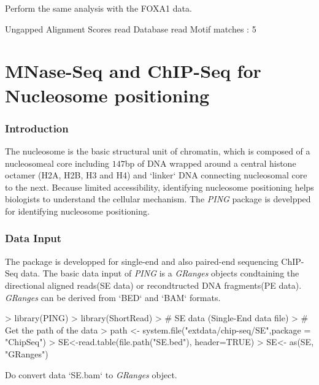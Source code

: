 \documentclass[12pt]{article}
\newcommand{\Rclass}[1]{{\textit{#1}}}
\begin{document}
\begin{Exercise}
Perform the same analysis with the FOXA1 data.
\end{Exercise}



\begin{Schunk}
\begin{Soutput}
	Ungapped Alignment
	Scores read
	Database read
	Motif matches : 5
\end{Soutput}
\end{Schunk}


\part{MNase-Seq and ChIP-Seq for Nucleosome positioning}
\section{Introduction}
The nucleosome is the basic structural unit of chromatin, which is composed of a nucleosomeal core including $147$bp of DNA wrapped around a central histone octamer (H2A, H2B, H3 and H4) and `linker` DNA connecting nucleosomal core to the next. Because limited accessibility, identifying nucleosome positioning helps biologists to understand the cellular mechanism. The \Rclass{PING} package is develpped for identifying nucleosome positioning. 
  
\section{Data Input}
The package is developped for single-end and also paired-end sequencing ChIP-Seq data.  
The basic data input of \Rclass{PING} is a \Rclass{GRanges} objects condtaining the directional aligned reads(SE data) or recondtructed DNA fragments(PE data). \Rclass{GRanges} can be derived from `BED` and `BAM` formats. 

\begin{Schunk}
\begin{Sinput}
> library(PING)
> library(ShortRead)
> # SE data (Single-End data file)
> # Get the path of the data
> path <- system.file("extdata/chip-seq/SE",package = "ChipSeq")
> SE<-read.table(file.path("SE.bed"), header=TRUE)
> SE<- as(SE, "GRanges")
\end{Sinput}
\end{Schunk}
\begin{Exercise}
Do convert data `SE.bam` to \Rclass{GRanges} object.
\end{Exercise}
\end{document}
